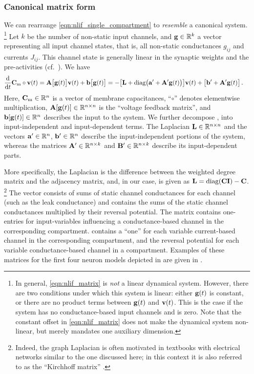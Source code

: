 \subsubsection{Canonical matrix form}
We can rearrange \cref{eqn:nlif_single_compartment} to \emph{resemble} a canonical \LTI system.%
\footnote{
In general, \cref{eqn:nlif_matrix} is \emph{not} a linear dynamical system.
However, there are two conditions under which this system is linear: either $\mathbf{g}(t)$ is constant, or there are no product terms between $\mathbf{g}(t)$ and ${\mathbf{v}}(t)$.
This is the case if the system has no conductance-based input channels and \mnAp is zero.
Note that the constant offset \vnbp in \cref{eqn:nlif_matrix} does not make the dynamical system non-linear, but merely mandates one auxiliary dimension.
}
Let $k$ be the number of non-static input channels, and $\mathbf{g} \in \mathbb{R}^k$ a vector representing all input channel states, that is, all non-static conductances $g_{ij}$ and currents $J_{ij}$.
This channel state is generally linear in the synaptic weights and the pre-activities (cf.~).
We have
\begin{align}
	\frac{\mathrm{d}}{\mathrm{d}t} {{\mathbf{C}}_\mathrm{m}} \circ {\ensuremath{\mathbf{v}}}(t)
	&= \mathbf{A}\bigl[\mathbf{g}(t)\bigr] {\ensuremath{\mathbf{v}}}(t) + \mathbf{b}\bigl[\mathbf{g}(t)\bigr]
	 = -\bigl[\mathbf{L} + \mathrm{diag}\bigl(\mathbf{a}' + \mathbf{A}' \mathbf{g}(t)\bigr)\bigr] {\ensuremath{\mathbf{v}}}(t) + \big[\mathbf{b}' + \mathbf{A}' \mathbf{g}(t)\big] \,.
	\label{eqn:nlif_matrix}
\end{align}
Here, ${{\mathbf{C}}_\mathrm{m}} \in \mathbb{R}^n$ is a vector of membrane capacitances, \enquote{$\circ$} denotes elementwise multiplication, $\mathbf{A}[\mathbf{g}(t)] \in \mathbb{R}^{n \times n}$ is the \enquote{voltage feedback matrix}, and $\mathbf{b}[\mathbf{g}(t)] \in \mathbb{R}^n$ describes the input to the system.
We further decompose \mnA, \vnb into input-independent and input-dependent terms.
The Laplacian $\mathbf{L} \in \mathbb{R}^{n \times n}$ and the vectors $\mathbf{a}' \in \mathbb{R}^n$, $\mathbf{b}' \in \mathbb{R}^n$ describe the input-independent portions of the system, whereas the matrices $\mathbf{A}' \in \mathbb{R}^{n \times k}$ and $\mathbf{B}' \in \mathbb{R}^{n \times k}$ describe its input-dependent parts.

More specifically, the Laplacian \mnL is the difference between the weighted degree matrix and the adjacency matrix, and, in our case, is given as $\mathbf{L} = \operatorname{\mathrm{diag}}(\mathbf{C} \mathbf{I}) - \mathbf{C}$.%
\footnote{Indeed, the graph Laplacian is often motivated in textbooks with electrical networks similar to the one discussed here; in this context it is also referred to as the \enquote{Kirchhoff matrix} \citep[e.g.,][Chapter~2]{bollobas1998modern}.}
The vector \vnap consists of sums of static channel conductances for each channel (such as the leak conductance) and \vnbp contains the sums of the static channel conductances multiplied by their reversal potential.
The matrix \mnAp contains one-entries for input-variables influencing a conductance-based channel in the corresponding compartment.
\mnBp contains a \enquote{one} for each variable current-based channel in the corresponding compartment, and the reversal potential for each variable conductance-based channel in a compartment.
Examples of these matrices for the first four \nlif neuron models depicted in  are given in .

